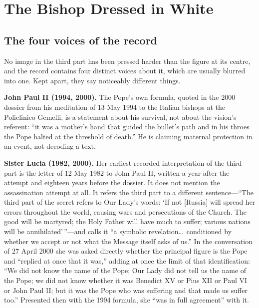 \section{The Bishop Dressed in White}\label{sec:bishop}

\subsection{The four voices of the record}

No image in the third part has been pressed harder than the figure at
its centre, and the record contains four distinct voices about it,
which are usually blurred into one. Kept apart, they say noticeably
different things.

\textbf{John Paul II (1994, 2000).} The Pope's own formula, quoted in
the 2000 dossier from his meditation of 13 May 1994 to the Italian
bishops at the Policlinico Gemelli, is a statement about his
survival, not about the vision's referent: ``it was a mother's hand
that guided the bullet's path and in his throes the Pope halted at
the threshold of death.'' He is claiming maternal protection in an
event, not decoding a text.

\textbf{Sister Lucia (1982, 2000).} Her earliest recorded
interpretation of the third part is the letter of 12 May 1982 to
John Paul II, written a year after the attempt and eighteen years
before the dossier. It does not mention the assassination attempt at
all. It refers the third part to a different sentence---``The third
part of the secret refers to Our Lady's words: `If not [Russia] will
spread her errors throughout the world, causing wars and persecutions
of the Church. The good will be martyred; the Holy Father will have
much to suffer; various nations will be annihilated'\,''---and calls
it ``a symbolic revelation\ldots\ conditioned by whether we accept or
not what the Message itself asks of us.'' In the conversation of
27 April 2000 she was asked directly whether the principal figure is
the Pope and ``replied at once that it was,'' adding at once the
limit of that identification: ``We did not know the name of the Pope;
Our Lady did not tell us the name of the Pope; we did not know
whether it was Benedict XV or Pius XII or Paul VI or John Paul II;
but it was the Pope who was suffering and that made us suffer too.''
Presented then with the 1994 formula, she ``was in full agreement''
with it.

